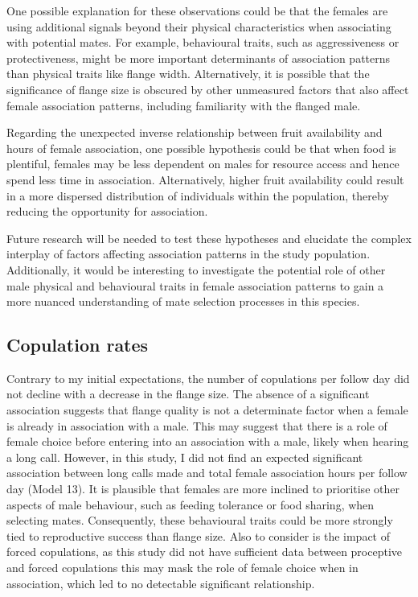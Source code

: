 One possible explanation for these observations could be that the females are using additional signals beyond their physical characteristics when associating with potential mates. For example, behavioural traits, such as aggressiveness or protectiveness, might be more important determinants of association patterns than physical traits like flange width. Alternatively, it is possible that the significance of flange size is obscured by other unmeasured factors that also affect female association patterns, including familiarity with the flanged male.

Regarding the unexpected inverse relationship between fruit availability and hours of female association, one possible hypothesis could be that when food is plentiful, females may be less dependent on males for resource access and hence spend less time in association. Alternatively, higher fruit availability could result in a more dispersed distribution of individuals within the population, thereby reducing the opportunity for association.

Future research will be needed to test these hypotheses and elucidate the complex interplay of factors affecting association patterns in the study population. Additionally, it would be interesting to investigate the potential role of other male physical and behavioural traits in female association patterns to gain a more nuanced understanding of mate selection processes in this species.

\subsection{Copulation rates}

Contrary to my initial expectations, the number of copulations per follow day did not decline with a decrease in the flange size. The absence of a significant association suggests that flange quality is not a determinate factor when a female is already in association with a male. This may suggest that there is a role of female choice before entering into an association with a male, likely when hearing a long call. However, in this study, I did not find an expected significant association between long calls made and total female association hours per follow day (Model 13). It is plausible that females are more inclined to prioritise other aspects of male behaviour, such as feeding tolerance or food sharing, when selecting mates. Consequently, these behavioural traits could be more strongly tied to reproductive success than flange size. Also to consider is the impact of forced copulations, as this study did not have sufficient data between proceptive and forced copulations this may mask the role of female choice when in association, which led to no detectable significant relationship. 

